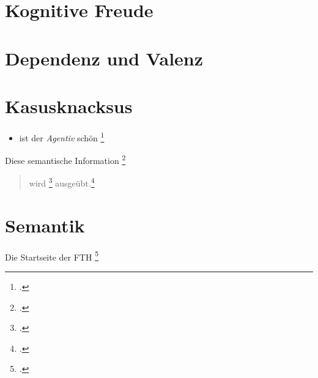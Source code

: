 \section{\label{kognitiv}Kognitive Freude}

\section{\label{valenz}Dependenz und Valenz}

\section{\label{case}Kasusknacksus}

\begin{itemize}
\item {} ist der \textit{Agentiv} schön \footcite[Buch][11ff.]{Alter2011}
\end{itemize}

Diese semantische Information \footcite[nach (Zeitschrift-)Artikel][8-12]{Williamson2009}

\begin{quote}
wird \footcite[nach Lexika][8-12]{Khan2013} ausgeübt.\footcite[nach Sammelband][8-12]{Fillmore1968}
\end{quote}
\section{\label{Semantik}Semantik}

Die Startseite der FTH \footcite{FTHStartseite2019}

%
%
%
%


\sloppy %

\printbibliography [heading=bibintoc]
\label{Literatur}


